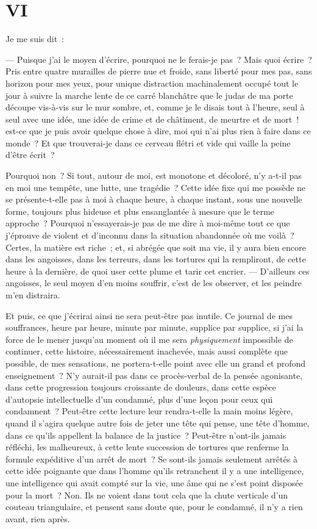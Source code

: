 \documentclass[french,twoside]{book} %
\begin{document}
 \section[{VI}]{VI}
\label{ch6}\renewcommand{\leftmark}{VI}

\noindent Je me suis dit :\par
— Puisque j’ai le moyen d’écrire, pourquoi ne le ferais-je pas ? Mais quoi écrire ? Pris entre quatre murailles de pierre nue et froide, sans liberté pour mes pas, sans horizon pour mes yeux, pour unique distraction machinalement occupé tout le jour à suivre la marche lente de ce carré blanchâtre que le judas de ma porte découpe vis-à-vis sur le mur sombre, et, comme je le disais tout à l’heure, seul à seul avec une idée, une idée de crime et de châtiment, de meurtre et de mort ! est-ce que je puis avoir quelque chose à dire, moi qui n’ai plus rien à faire dans ce monde ? Et que trouverai-je dans ce cerveau flétri et vide qui vaille la peine d’être écrit ?\par
Pourquoi non ? Si tout, autour de moi, est monotone et décoloré, n’y a-t-il pas en moi une tempête, une lutte, une tragédie ? Cette idée fixe qui me possède ne se présente-t-elle pas à moi à chaque heure, à chaque instant, sous une nouvelle forme, toujours  plus hideuse et plus ensanglantée à mesure que le terme approche ? Pourquoi n’essayerais-je pas de me dire à moi-même tout ce que j’éprouve de violent et d’inconnu dans la situation abandonnée où me voilà ? Certes, la matière est riche ; et, si abrégée que soit ma vie, il y aura bien encore dans les angoisses, dans les terreurs, dans les tortures qui la rempliront, de cette heure à la dernière, de quoi user cette plume et tarir cet encrier. — D’ailleurs ces angoisses, le seul moyen d’en moins souffrir, c’est de les observer, et les peindre m’en distraira.\par
Et puis, ce que j’écrirai ainsi ne sera peut-être pas inutile. Ce journal de mes souffrances, heure par heure, minute par minute, supplice par supplice, si j’ai la force de le mener jusqu’au moment où il me sera \emph{physiquement} impossible de continuer, cette histoire, nécessairement inachevée, mais aussi complète que possible, de mes sensations, ne portera-t-elle point avec elle un grand et profond enseignement ? N’y aurait-il pas dans ce procès-verbal de la pensée agonisante, dans cette progression toujours croissante de douleurs, dans cette espèce d’autopsie intellectuelle d’un condamné, plus d’une leçon pour ceux qui condamnent ? Peut-être cette lecture leur rendra-t-elle la main moins légère, quand il s’agira quelque autre fois de jeter une tête qui pense, une tête d’homme, dans ce qu’ils appellent la balance de la justice ? Peut-être n’ont-ils jamais réfléchi, les malheureux, à cette lente succession de tortures que renferme la formule expéditive d’un arrêt de mort ? Se sont-ils  jamais seulement arrêtés à cette idée poignante que dans l’homme qu’ils retranchent il y a une intelligence, une intelligence qui avait compté sur la vie, une âme qui ne s’est point disposée pour la mort ? Non. Ils ne voient dans tout cela que la chute verticale d’un couteau triangulaire, et pensent sans doute que, pour le condamné, il n’y a rien avant, rien après.\par
\end{document}
